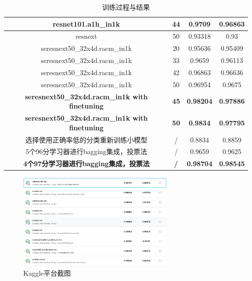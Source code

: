 \documentclass[12pt,a4paper,UTF8]{article}
\begin{document}
\begin{table}[htbp]
{\begin{tabular}{|c|c|c|c|}
  \textbf{resnet101.a1h\_in1k}                             & \textbf{44}    & \textbf{0.9709}        & \textbf{0.96863}      \\ \hline
  resnext                                                  & 50             & 0.93318                & 0.93                  \\ \hline
  seresnext50\_32x4d.racm\_in1k                            & 20             & 0.95636                & 0.95409               \\ \hline
  seresnext50\_32x4d.racm\_in1k                            & 33             & 0.9659                 & 0.96113               \\ \hline
  seresnext50\_32x4d.racm\_in1k                            & 42             & 0.96863                & 0.96636               \\ \hline
  seresnext50\_32x4d.racm\_in1k                            & 50             & 0.96954                & 0.9675                \\ \hline
  \textbf{seresnext50\_32x4d.racm\_in1k   with finetuning} & \textbf{45}    & \textbf{0.98204}       & \textbf{0.97886}      \\ \hline
  \textbf{seresnext50\_32x4d.racm\_in1k   with finetuning} & \textbf{50}    & \textbf{0.9834}        & \textbf{0.97795}      \\ \hline
  选择使用正确率低的分类重新训练小模型                                       & /              & 0.8834                 & 0.8859                \\ \hline
  5个96分学习器进行bagging集成，投票法                                  & /              & 0.9659                 & 0.9625                \\ \hline
  \textbf{4个97分学习器进行bagging集成，投票法}                         & \textbf{/}     & \textbf{0.98704}       & \textbf{0.98545}      \\ \hline
  \end{tabular}%
  }
  \caption{训练过程与结果}
  \end{table}


\begin{figure}[htbp] \centering \includegraphics[width=0.7\textwidth]{figures/2024-12-12-18-42-21.png} \caption{ Kaggle平台截图} \end{figure}
\end{document}
